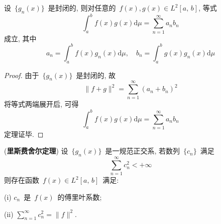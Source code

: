 \begin{Theorem}
设~$\{g_{n}(x)\}$~是封闭的, 则对任意的~$f(x), g(x)\in L^2[a,\,b]$, 等式
\[
\int_{a}^{b}f(x)g(x)\mathrm{d}\mu=\sum_{n=1}^{\infty}a_{n}b_{n}
\]
成立, 其中
\[
a_{n}=\int_{a}^{b}f(x)g_{n}(x)\mathrm{d}\mu,\quad b_{n}=\int_{a}^{b}g(x)g_{n}(x)\mathrm{d}\mu
\]
\end{Theorem}

\begin{proof}
由于~$\{g_{n}(x)\}$~是封闭的, 故
\[
\|f+g\|^{2}=\sum_{n=1}^{\infty}(a_{n}+b_{n})^{2}
\]
将等式两端展开后, 可得
\[
\int_{a}^{b}f(x)g(x)\mathrm{d}\mu=\sum_{n=1}^{\infty}a_{n}b_{n}
\]
定理证毕.
\end{proof}

\begin{Theorem}(\textbf{里斯\raisebox{0.5mm}{--}费舍尔定理}) 设~$\{g_{n}(x)\}$~是一规范正交系, 若数列~$\{c_{n}\}$~满足
\[
\sum_{n=1}^{\infty}c_{n}^{2}<+\infty
\]
则存在函数~$f(x)\in L^2[a,\,b]$~满足:

(i) $c_{n}$~是~$f(x)$~的傅里叶系数;

(ii) $\sum\limits_{n=1}^{\infty}c_{n}^{2}=\|f\|^{2}$.
\end{Theorem}

